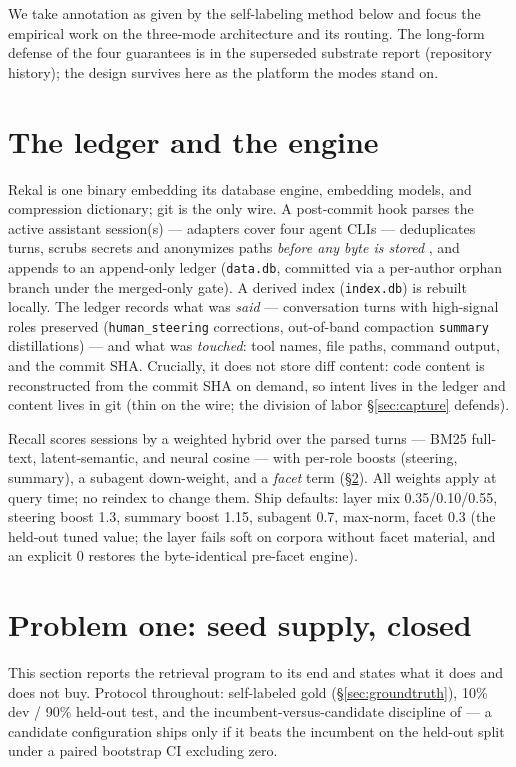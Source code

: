 \documentclass[twocolumn,10pt]{article}
\newcommand{\code}[1]{\texttt{#1}}
\begin{document}
We take annotation as given by the self-labeling method below and focus the empirical work on the three-mode architecture and its routing. The long-form defense of the four guarantees is in the superseded substrate report (repository history); the design survives here as the platform the modes stand on.

\section{The ledger and the engine}\label{sec:engine}

Rekal is one binary embedding its database engine, embedding models, and compression dictionary; git is the only wire. A post-commit hook parses the active assistant session(s) --- adapters cover four agent CLIs --- deduplicates turns, scrubs secrets and anonymizes paths \emph{before any byte is stored} \citep{statecontam2026}, and appends to an append-only ledger (\code{data.db}, committed via a per-author orphan branch under the merged-only gate). A derived index (\code{index.db}) is rebuilt locally. The ledger records what was \emph{said} --- conversation turns with high-signal roles preserved (\code{human\_steering} corrections, out-of-band compaction \code{summary} distillations) --- and what was \emph{touched}: tool names, file paths, command output, and the commit SHA. Crucially, it does not store diff content: code content is reconstructed from the commit SHA on demand, so intent lives in the ledger and content lives in git (thin on the wire; the division of labor \S\ref{sec:capture} defends).

Recall scores sessions by a weighted hybrid over the parsed turns --- BM25 full-text, latent-semantic, and neural cosine --- with per-role boosts (steering, summary), a subagent down-weight, and a \emph{facet} term (\S\ref{sec:seed}). All weights apply at query time; no reindex to change them. Ship defaults: layer mix 0.35/0.10/0.55, steering boost 1.3, summary boost 1.15, subagent 0.7, max-norm, facet 0.3 (the held-out tuned value; the layer fails soft on corpora without facet material, and an explicit 0 restores the byte-identical pre-facet engine).

\section{Problem one: seed supply, closed}\label{sec:seed}

This section reports the retrieval program to its end and states what it does and does not buy. Protocol throughout: self-labeled gold (\S\ref{sec:groundtruth}), 10\% dev / 90\% held-out test, and the incumbent-versus-candidate discipline of \citet{rho2026} --- a candidate configuration ships only if it beats the incumbent on the held-out split under a paired bootstrap CI excluding zero.
\end{document}
